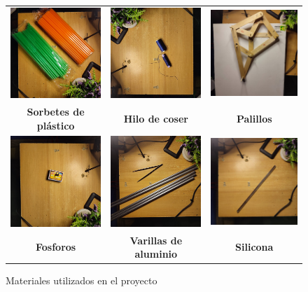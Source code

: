 \begin{figure}[H]
  \centering
  \begin{tabular}{ccc}
    \includegraphics[width=0.25\linewidth]{./assets/sorbete.jpeg} & 
    \includegraphics[width=0.25\linewidth]{./assets/hilo.jpeg} & 
    \includegraphics[width=0.25\linewidth]{./assets/palillos.jpeg} \\
    \textbf{Sorbetes de plástico} & \textbf{Hilo de coser} & \textbf{Palillos} \\
    \includegraphics[width=0.25\linewidth]{./assets/fosforos.jpeg} & 
    \includegraphics[width=0.25\linewidth]{./assets/aluminio.jpeg} & 
    \includegraphics[width=0.25\linewidth]{./assets/silicona.jpeg} \\
    \textbf{Fosforos} & \textbf{Varillas de aluminio} & \textbf{Silicona} \\
  \end{tabular}
  \caption{Materiales utilizados en el proyecto}
  \label{fig:materiales}
\end{figure}

